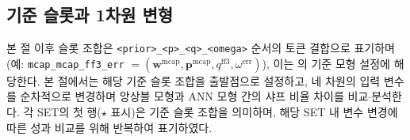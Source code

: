 \documentclass[eng]{kjas3}
\begin{document}
\subsection{기준 슬롯과 1차원 변형}\label{subsec:baseline_slot}

본 절 이후 슬롯 조합은 \texttt{<prior>\_<p>\_<q>\_<omega>} 순서의 토큰 결합으로 표기하며 (예: \texttt{mcap\_mcap\_ff3\_err} $= (\mathbf{w}^{\mathrm{mcap}}, \mathbf{p}^{\mathrm{mcap}}, q^{\mathrm{ff3}}, \omega^{\mathrm{err}})$), 이는 \citet{pyo2018}의 기준 모형 설정에 해당한다. 본 절에서는 해당 기준 슬롯 조합을 출발점으로 설정하고, 네 차원의 입력 변수를 순차적으로 변경하며 앙상블 모형과 ANN 모형 간의 샤프 비율 차이를 비교$\cdot$분석한다. 각 SET의 첫 행($\star$ 표시)은 기준 슬롯 조합을 의미하며, 해당 SET 내 변수 변경에 따른 성과 비교를 위해 반복하여 표기하였다.
\end{document}
